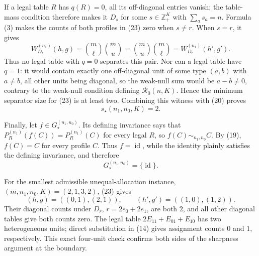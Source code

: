 If a legal table \(R\) has \(q(R)=0\), all its off-diagonal entries vanish;
the table-mass condition therefore makes it \(D_s\) for some
\(s\in\mathbb Z_+^K\) with \(\sum_a s_a=n\).  Formula (3) makes the counts
of both profiles in (23) zero when \(s\neq r\).  When \(s=r\), it gives
\[
 W_{D_r}^{(n_1)}(h,g)
 =\binom m\ell\binom mu
 =\binom mu\binom m\ell
 =W_{D_r}^{(n_1)}(h',g').
 \tag{25}
\]
Thus no legal table with \(q=0\) separates this pair.  Nor can a legal table
have \(q=1\): it would contain exactly one off-diagonal unit of some type
\((a,b)\) with \(a\neq b\), all other units being diagonal, so the weak-null
sum would be \(a-b\neq0\), contrary to the weak-null condition defining
\(\mathcal R_0(n,K)\).  Hence the minimum separator size for (23) is at
least two.  Combining this witness with (20) proves
\[
 s_\star(n_1,n_0,K)=2.
 \tag{26}
\]

Finally, let \(f\in G_\star^{(n_1,n_0)}\).  Its defining invariance says that
\(P_R^{(n_1)}(f(C))=P_R^{(n_1)}(C)\) for every legal \(R\), so
\(f(C)\sim_{n_1,n_0}C\).  By (19), \(f(C)=C\) for every profile \(C\).
Thus \(f=\operatorname{id}\), while the identity plainly satisfies the
defining invariance, and therefore
\[
 G_\star^{(n_1,n_0)}=\{\operatorname{id}\}.
 \tag{27}
\]

For the smallest admissible unequal-allocation instance,
\((m,n_1,n_0,K)=(2,1,3,2)\), (23) gives
\[
 (h,g)=((0,1),(2,1)),\qquad
 (h',g')=((1,0),(1,2)).
\]
Their diagonal counts under \(D_r\), \(r=2e_0+2e_1\), are both \(2\), and
all other diagonal tables give both counts zero.  The legal table
\(2E_{11}+E_{01}+E_{10}\) has two heterogeneous units; direct substitution
in (14) gives assignment counts \(0\) and \(1\), respectively.  This exact
four-unit check confirms both sides of the sharpness argument at the
boundary.
